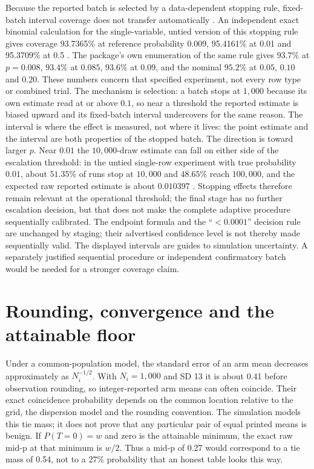 \documentclass[11pt,a4paper]{article}
\begin{document}
Because the reported batch is selected by a data-dependent stopping rule, fixed-batch interval coverage does not transfer automatically \citep{besag1991}. An independent exact binomial calculation for the single-variable, untied version of this stopping rule gives coverage 93.7365\% at reference probability 0.009, 95.4161\% at 0.01 and 95.3709\% at 0.5 \citep{audit2026full}. The package's own enumeration of the same rule gives $93.7\%$ at $p=0.008$, $93.4\%$ at $0.085$, $93.6\%$ at $0.09$, and the nominal $95.2\%$ at $0.05$, $0.10$ and $0.20$. These numbers concern that specified experiment, not every row type or combined trial. The mechanism is selection: a batch stops at $1{,}000$ because its own estimate read at or above $0.1$, so near a threshold the reported estimate is biased upward and its fixed-batch interval undercovers for the same reason. The interval is where the effect is measured, not where it lives: the point estimate and the interval are both properties of the stopped batch. The direction is toward larger $p$. Near $0.01$ the $10{,}000$-draw estimate can fall on either side of the escalation threshold: in the untied single-row experiment with true probability $0.01$, about $51.35\%$ of runs stop at $10{,}000$ and $48.65\%$ reach $100{,}000$, and the expected raw reported estimate is about $0.010397$ \citep{paperaudit2026}. Stopping effects therefore remain relevant at the operational threshold; the final stage has no further escalation decision, but that does not make the complete adaptive procedure sequentially calibrated. The endpoint formula and the ``$<0.0001$'' decision rule are unchanged by staging; their advertised confidence level is not thereby made sequentially valid. The displayed intervals are guides to simulation uncertainty. A separately justified sequential procedure or independent confirmatory batch would be needed for a stronger coverage claim.

\section{Rounding, convergence and the attainable floor}
\label{sec:rounding}

Under a common-population model, the standard error of an arm mean decreases approximately as $N_i^{-1/2}$. With $N_i=1{,}000$ and SD 13 it is about 0.41 before observation rounding, so integer-reported arm means can often coincide. Their exact coincidence probability depends on the common location relative to the grid, the dispersion model and the rounding convention. The simulation models this tie mass; it does not prove that any particular pair of equal printed means is benign. If $P(T=0)=w$ and zero is the attainable minimum, the exact raw mid-p at that minimum is $w/2$. Thus a mid-p of 0.27 would correspond to a tie mass of 0.54, not to a 27\% probability that an honest table looks this way.
\end{document}
